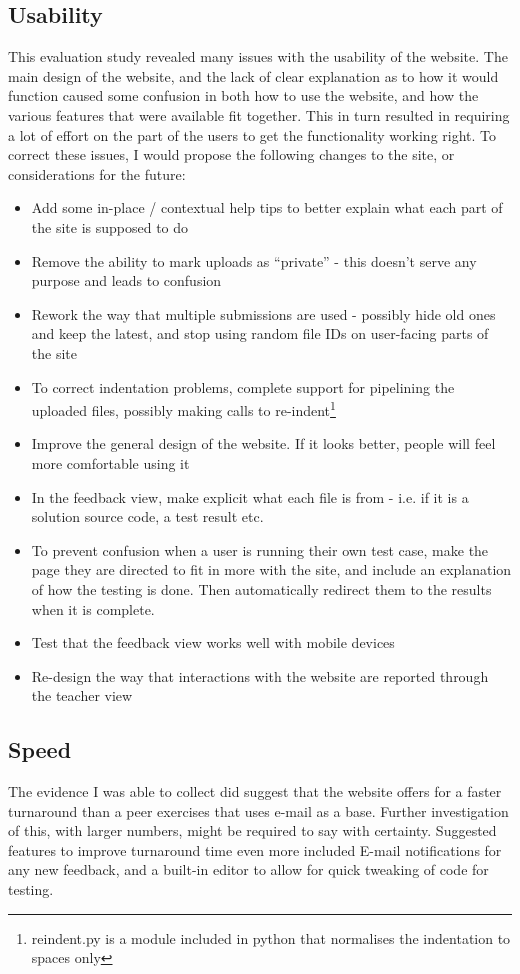 \documentclass[a4paper,11pt]{report}
\begin{document}
\subsection{Usability}
This evaluation study revealed many issues with the usability of the website. The main design of the website, and the lack of clear explanation as to how it would function caused some confusion in both how to use the website, and how the various features that were available fit together. This in turn resulted in requiring a lot of effort on the part of the users to get the functionality working right. To correct these issues, I would propose the following changes to the site, or considerations for the future:
\begin{itemize}
\item Add some in-place / contextual help tips to better explain what each part of the site is supposed to do
\item Remove the ability to mark uploads as ``private'' - this doesn't serve any purpose and leads to confusion
\item Rework the way that multiple submissions are used - possibly hide old ones and keep the latest, and stop using random file IDs on user-facing parts of the site
\item To correct indentation problems, complete support for pipelining the uploaded files, possibly making calls to re-indent\footnote{reindent.py is a module included in python that normalises the indentation to spaces only}
\item Improve the general design of the website. If it looks better, people will feel more comfortable using it
\item In the feedback view, make explicit what each file is from - i.e. if it is a solution source code, a test result etc.
\item To prevent confusion when a user is running their own test case, make the page they are directed to fit in more with the site, and include an explanation of how the testing is done. Then automatically redirect them to the results when it is complete.
\item Test that the feedback view works well with mobile devices
\item Re-design the way that interactions with the website are reported through the teacher view
\end{itemize}
\subsection{Speed}
The evidence I was able to collect did suggest that the website offers for a faster turnaround than a peer exercises that uses e-mail as a base. Further investigation of this, with larger numbers, might be required to say with certainty. Suggested features to improve turnaround time even more included E-mail notifications for any new feedback, and a built-in editor to allow for quick tweaking of code for testing.
\end{document}
